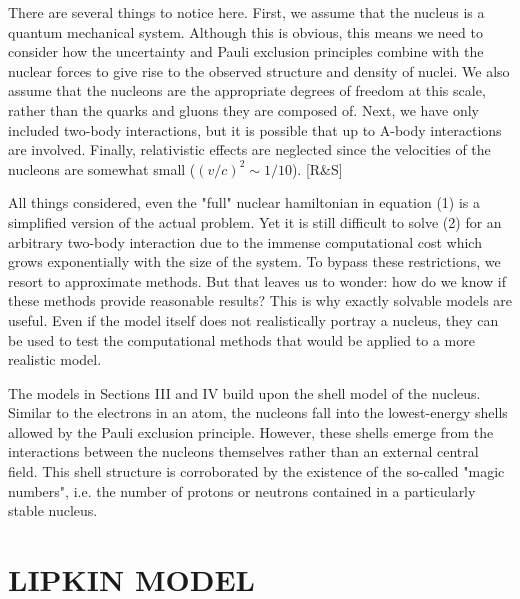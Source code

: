 \documentclass[prb,aps,twocolumn,showpacs,10pt]{revtex4-2}
\begin{document}
There are several things to notice here. First, we assume that the nucleus is a quantum mechanical system. Although this is obvious, this means we need to consider how the uncertainty and Pauli exclusion principles combine with the nuclear forces to give rise to the observed structure and density of nuclei. We also assume that the nucleons are the appropriate degrees of freedom at this scale, rather than the quarks and gluons they are composed of. Next, we have only included two-body interactions, but it is possible that up to A-body interactions are involved. Finally, relativistic effects are neglected since the velocities of the nucleons are somewhat small ($(v/c)^2 \sim 1/10$). [R\&S]

All things considered, even the "full" nuclear hamiltonian in equation (1) is a simplified version of the actual problem. Yet it is still difficult to solve (2) for an arbitrary two-body interaction due to the immense computational cost which grows exponentially with the size of the system. To bypass these restrictions, we resort to approximate methods. But that leaves us to wonder: how do we know if these methods provide reasonable results? This is why exactly solvable models are useful. Even if the model itself does not realistically portray a nucleus, they can be used to test the computational methods that would be applied to a more realistic model.

The models in Sections III and IV build upon the shell model of the nucleus. Similar to the electrons in an atom, the nucleons fall into the lowest-energy shells allowed by the Pauli exclusion principle. However, these shells emerge from the interactions between the nucleons themselves rather than an external central field. This shell structure is corroborated by the existence of the so-called "magic numbers", i.e. the number of protons or neutrons contained in a particularly stable nucleus. 

\section{LIPKIN MODEL}
\end{document}
